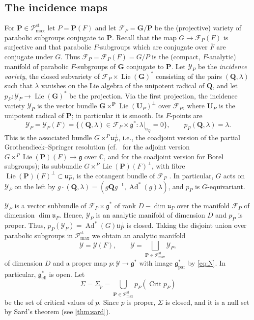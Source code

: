 \documentclass[11pt,reqno]{amsart}
\numberwithin{equation}{section}
\theoremstyle{plain}
\theoremstyle{definition}
\theoremstyle{remark}
\theoremstyle{plain}
\newcommand{\C}{\mathbb{C}}      %
\newcommand{\bG}{\mathbf{G}}     %
\newcommand{\bP}{\mathbf{P}}     %
\newcommand{\bQ}{\mathbf{Q}}     %
\newcommand{\bU}{\mathbf{U}}     %
\newcommand{\g}{\mathfrak{g}}    %
\newcommand{\gd}{\mathfrak{g}^*} %
\newcommand{\uu}{\mathfrak{u}}   %
\newcommand{\Ell}[2][]{#2_{#1\mathrm{ell}}}   %
\newcommand{\Par}[2][]{#2_{#1\mathrm{par}}}
\newcommand{\Pc}{\mathscr{P}^{\mathrm{st}}_{\mathrm{max}}}    %
\newcommand{\Fl}{\mathcal{F}}    %
\newcommand{\bFl}{\boldsymbol{\Fl}}  %
\DeclareMathOperator{\Ad}{Ad}
\DeclareMathOperator{\Lie}{Lie}
\DeclareMathOperator{\Crit}{Crit}
\newcommand{\lf}{\lambda}
\newcommand{\Inc}{\mathcal{Y}}
\newcommand{\bInc}{\boldsymbol{\Inc}}
\newcommand{\Crv}{\Sigma}
\begin{document}
\subsection{The incidence maps}\label{sec:incidencemaps}
For $\bP\in\Pc$ let $P=\bP(F)$ and let $\bFl_P=\bG/\bP$ be the (projective)
variety of parabolic subgroups conjugate to $\bP$.
Recall that the map $G\to\bFl_P(F)$ is surjective and that
parabolic $F$-subgroups which are conjugate over $\bar F$ are conjugate under $G$.
Thus $\Fl_P=\bFl_P(F)=G/P$ is the (compact, $F$-analytic) manifold of parabolic
$F$-subgroups of $\bG$ conjugate to $\bP$.
Let $\bInc_P$ be the \emph{incidence variety}, the closed subvariety of
$\bFl_P\times\Lie(\bG)^*$ consisting of the pairs $(\bQ,\lf)$ such that $\lf$
vanishes on the Lie algebra of the unipotent radical of $\bQ$, and let
$p_P:\bInc_P\to\Lie(\bG)^*$ be the projection. Via the first projection, the
incidence variety $\bInc_P$ is the vector bundle
$\bG\times^{\bP}\Lie(\bU_P)^\perp$ over $\bFl_P$, where $\bU_P$ is the unipotent
radical of $\bP$; in particular it is smooth. Its $F$-points are
\begin{equation}\label{eq:Y}
\Inc_P=\bInc_P(F)=\{(\bQ,\lf)\in\Fl_P\times\gd:\lf|_{\uu_Q}=0\},\qquad p_P(\bQ,\lf)=\lf.
\end{equation}
This is the associated bundle $G\times^P\uu_P^\perp$, i.e., the
coadjoint version of the partial Grothendieck--Springer resolution
(cf.~\cite{MR737927} for the adjoint version $G\times^P\Lie(\bP)(F)\to\g$ over $\C$,
and \cite[\S2.4]{Chi26} for the coadjoint version for Borel subgroups);
its subbundle $G\times^P\Lie(\bP)(F)^\perp$, with fibre
$\Lie(\bP)(F)^\perp\subset\uu_P^\perp$, is the cotangent bundle of $\Fl_P$
\cite[Lemma~1.4.9]{MR1433132}.
In particular, $G$ acts on $\Inc_P$ on the left by
$g\cdot(\bQ,\lf)=(g\bQ g^{-1},\Ad^*(g)\lf)$, and $p_P$ is $G$-equivariant.

$\Inc_P$ is a vector subbundle of $\Fl_P\times\gd$ of rank $D-\dim\uu_P$
over the manifold $\Fl_P$ of dimension $\dim\uu_P$.
Hence, $\Inc_P$ is an analytic manifold of dimension $D$ and $p_P$ is proper.
Thus, $p_P(\Inc_P)=\Ad^*(G)\uu_P^\perp$ is closed.
Taking the disjoint union over parabolic subgroups in $\Pc$ we obtain an analytic manifold
\[
\Inc=\bInc(F),\qquad \bInc=\bigsqcup_{\bP\in\Pc}\bInc_P,
\]
of dimension $D$ and a proper map $p:\Inc\to\gd$ with image $\Par{\gd}$ by \eqref{eq:N}.
In particular, $\Ell{\gd}$ is open. Let
\begin{equation}\label{eq:Sigma}
\Crv=\Crv_p=\bigcup_{\bP\in\Pc}p_P(\Crit p_P)
\end{equation}
be the set of critical values of $p$. Since $p$ is proper, $\Crv$ is closed, and
it is a null set by Sard's theorem (see \cref{thm:sard}).
\end{document}
